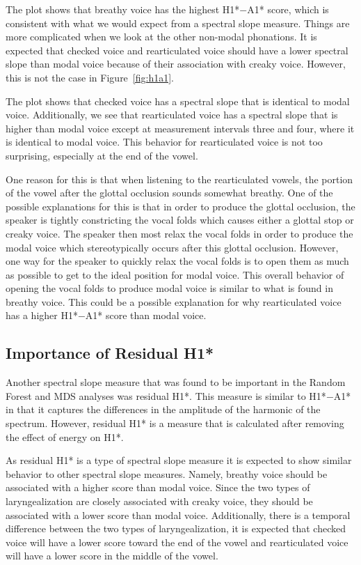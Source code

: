 The plot shows that breathy voice has the highest H1*$-$A1* score, which is consistent with what we would expect from a spectral slope measure. Things are more complicated when we look at the other non-modal phonations. It is expected that checked voice and rearticulated voice should have a lower spectral slope than modal voice because of their association with creaky voice. However, this is not the case in Figure~\ref{fig:h1a1}. 

The plot shows that checked voice has a spectral slope that is identical to modal voice. Additionally, we see that rearticulated voice has a spectral slope that is higher than modal voice except at measurement intervals three and four, where it is identical to modal voice. This behavior for rearticulated voice is not too surprising, especially at the end of the vowel. 

One reason for this is that when listening to the rearticulated vowels, the portion of the vowel after the glottal occlusion sounds somewhat breathy. One of the possible explanations for this is that in order to produce the glottal occlusion, the speaker is tightly constricting the vocal folds which causes either a glottal stop or creaky voice. The speaker then most relax the vocal folds in order to produce the modal voice which stereotypically occurs after this glottal occlusion. However, one way for the speaker to quickly relax the vocal folds is to open them as much as possible to get to the ideal position for modal voice. This overall behavior of opening the vocal folds to produce modal voice is similar to what is found in breathy voice. This could be a possible explanation for why rearticulated voice has a higher H1*$-$A1* score than modal voice.

\subsection{Importance of Residual H1*} \label{sec:rh1_discussion}

Another spectral slope measure that was found to be important in the Random Forest and MDS analyses was residual H1*. This measure is similar to H1*$-$A1* in that it captures the differences in the amplitude of the harmonic of the spectrum. However, residual H1* is a measure that is calculated after removing the effect of energy on H1*. 

As residual H1* is a type of spectral slope measure it is expected to show similar behavior to other spectral slope measures. Namely, breathy voice should be associated with a higher score than modal voice. Since the two types of laryngealization are closely associated with creaky voice, they should be associated with a lower score than modal voice. Additionally, there is a temporal difference between the two types of laryngealization, it is expected that checked voice will have a lower score toward the end of the vowel and  rearticulated voice will have a lower score in the middle of the vowel. 

